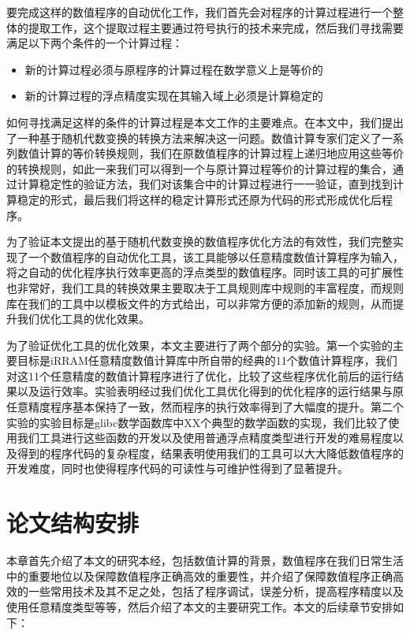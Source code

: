 要完成这样的数值程序的自动优化工作，我们首先会对程序的计算过程进行一个整体的提取工作，这个提取过程主要通过符号执行的技术来完成，然后我们寻找需要满足以下两个条件的一个计算过程：
\begin{itemize}
\item 新的计算过程必须与原程序的计算过程在数学意义上是等价的
\item 新的计算过程的浮点精度实现在其输入域上必须是计算稳定的
\end{itemize}
如何寻找满足这样的条件的计算过程是本文工作的主要难点。在本文中，我们提出了一种基于随机代数变换的转换方法来解决这一问题。数值计算专家们定义了一系列数值计算的等价转换规则，我们在原数值程序的计算过程上递归地应用这些等价的转换规则，如此一来我们可以得到一个与原计算过程等价的计算过程的集合，通过计算稳定性的验证方法，我们对该集合中的计算过程进行一一验证，直到找到计算稳定的形式，最后我们将这样的稳定计算形式还原为代码的形式形成优化后程序。

为了验证本文提出的基于随机代数变换的数值程序优化方法的有效性，我们完整实现了一个数值程序的自动优化工具，该工具能够以任意精度数值计算程序为输入，将之自动的优化程序执行效率更高的浮点类型的数值程序。同时该工具的可扩展性也非常好，我们工具的转换效果主要取决于工具规则库中规则的丰富程度，而规则库在我们的工具中以模板文件的方式给出，可以非常方便的添加新的规则，从而提升我们优化工具的优化效果。

为了验证优化工具的优化效果，本文主要进行了两个部分的实验。第一个实验的主要目标是iRRAM任意精度数值计算库中所自带的经典的11个数值计算程序，我们对这11个任意精度的数值计算程序进行了优化，比较了这些程序优化前后的运行结果以及运行效率。实验表明经过我们优化工具优化得到的优化程序的运行结果与原任意精度程序基本保持了一致，然而程序的执行效率得到了大幅度的提升。第二个实验的实验目标是glibc数学函数库中XX个典型的数学函数的实现，我们比较了使用我们工具进行这些函数的开发以及使用普通浮点精度类型进行开发的难易程度以及得到的程序代码的复杂程度，结果表明使用我们的工具可以大大降低数值程序的开发难度，同时也使得程序代码的可读性与可维护性得到了显著提升。

\section{论文结构安排}

本章首先介绍了本文的研究本经，包括数值计算的背景，数值程序在我们日常生活中的重要地位以及保障数值程序正确高效的重要性，并介绍了保障数值程序正确高效的一些常用技术及其不足之处，包括了程序调试，误差分析，提高程序精度以及使用任意精度类型等等，然后介绍了本文的主要研究工作。本文的后续章节安排如下：

